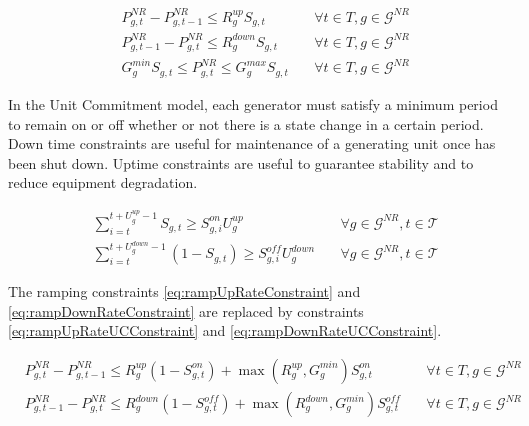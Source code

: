 \documentclass[12pt,LUDisStyle,twosided]{book}
\newcommand{\mc}{\mathcal}
\begin{document}
\begin{subequations}\label{model:UC_NewConstraints}
\begin{alignat}{4}
& P^{NR}_{g,t} - P^{NR}_{g,t - 1} \leq R^{up}_{g} S_{g,t} &~& \forall t \in T, g \in \mc{G}^{NR}\label{eq:UCrampUpRateConstraint} \\
& P^{NR}_{g,t -1 } - P^{NR}_{g,t} \leq R^{down}_{g} S_{g,t} &~& \forall t \in T, g \in \mc{G}^{NR}\label{eq:UCrampDownRateConstraint} \\
& G^{min}_{g} S_{g,t}\leq P^{NR}_{g,t} \leq G^{max}_{g} S_{g,t} &~& \forall t \in T, g \in \mc{G}^{NR}\label{eq:UCgenerationBounds}
\end{alignat} 
\end{subequations}

In the Unit Commitment model, each generator must satisfy a minimum period to remain on or off whether  or not there is a state change in a certain period. Down time constraints are useful for maintenance of a generating unit once has been shut down. Uptime constraints are useful to guarantee stability and to reduce equipment degradation. 

\begin{subequations}\label{model:ucMinDownUpConstraints}
\begin{alignat}{4}
& \sum_{i = t}^{t + U^{up}_{g} - 1} S_{g,t} \geq S^{on}_{g,i} U^{up}_{g} &~& \forall g \in \mc{G}^{NR}, t \in \mc{T} \label{eq:mindownt} \\
& \sum_{i = t}^{t + U^{down}_{g} - 1} (1 -S_{g,t}) \geq S^{off}_{g,i} U^{down}_{g} &~& \forall g \in \mc{G}^{NR}, t \in \mc{T} \label{eq:minupt}
\end{alignat} 
\end{subequations}

The ramping constraints \ref{eq:rampUpRateConstraint} and \ref{eq:rampDownRateConstraint} are replaced by constraints \ref{eq:rampUpRateUCConstraint} and \ref{eq:rampDownRateUCConstraint}.

\begin{subequations}
\begin{alignat}{4}
& P^{NR}_{g,t} - P^{NR}_{g,t - 1} \leq R^{up}_{g}(1 - S^{on}_{g,t}) + \max(R^{up}_{g},G^{min}_{g})S^{on}_{g,t} &~& \forall t \in T, g \in \mc{G}^{NR}\label{eq:rampUpRateUCConstraint} \\
& P^{NR}_{g,t -1 } - P^{NR}_{g,t} \leq R^{down}_{g}(1 - S^{off}_{g,t}) + \max(R^{down}_{g},G^{min}_{g})S^{off}_{g,t} &~& \forall t \in T, g \in \mc{G}^{NR}\label{eq:rampDownRateUCConstraint}
\end{alignat} 
\end{subequations}
\end{document}
